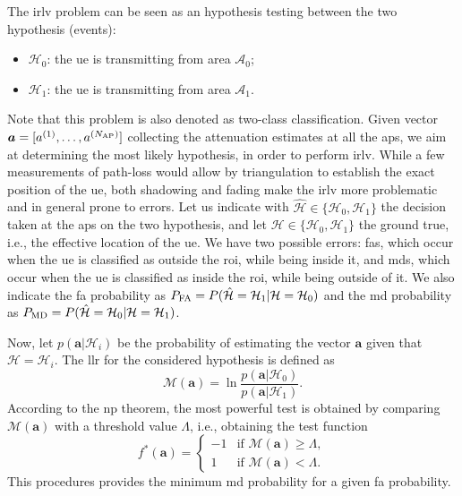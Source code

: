 \documentclass[draftcls,onecolumn,12pt]{IEEEtran}
\begin{document}
The \ac{irlv} problem can be seen as an hypothesis testing between the two hypothesis (events):
\begin{itemize}
    \item $\mathcal{H}_0$: the \ac{ue} is transmitting from area $\mathcal{A}_0$;
    \item $\mathcal{H}_1$: the \ac{ue} is transmitting from area $\mathcal{A}_1$.
\end{itemize}
Note that this problem is also denoted as two-class classification. Given vector $\bm{a} = [a^{(1)}, \ldots, a^{(N_{\rm AP})}]$ collecting the attenuation estimates at all the \acp{ap}, we aim  at determining the most likely hypothesis, in order to perform  \ac{irlv}. While a few measurements of path-loss would allow by triangulation to establish the exact position of the \ac{ue}, both shadowing and fading make the \ac{irlv} more problematic and in general prone to errors. Let us indicate with $\hat{\mathcal H} \in  \{\mathcal{H}_0, \mathcal{H}_1\}$ the decision taken at the \acp{ap} on the two hypothesis, and let $\mathcal H \in  \{\mathcal{H}_0, \mathcal{H}_1\}$ the ground true, i.e., the effective location of the \ac{ue}. We have two possible errors: \acp{fa}, which occur when the \ac{ue}  is classified as outside the \ac{roi}, while being inside it, and \acp{md}, which occur when the \ac{ue}  is classified as inside the \ac{roi}, while being outside of it. We also indicate the \ac{fa} probability  as $P_{\rm FA} =P(\hat{\mathcal H} = \mathcal H_1 | \mathcal H = \mathcal H_0)$ and the \ac{md} probability as $P_{\rm MD}=P(\hat{\mathcal H} = \mathcal H_0 | \mathcal H = \mathcal H_1)$.

Now, let  $p(\bm{a}|\mathcal{H}_i)$ be the probability of estimating the vector $\bm{a}$ given that  $\mathcal{H} = \mathcal{H}_i$. The \ac{llr} for the considered hypothesis is defined as 
\begin{equation}\label{eq:lr}
    {\mathcal M}(\bm{a})=\ln \frac{p(\bm{a}|\mathcal{H}_0)}{p(\bm{a}|\mathcal{H}_1)}.
\end{equation}
According to the \ac{np} theorem, the most powerful test is obtained by comparing $\mathcal{M}(\bm{a})$ with a threshold value $\Lambda$, i.e., obtaining the test function
\begin{equation}
\label{eq:oneClassDec}
f^*(\bm{a}) =
\begin{cases}
-1 &\text{if } {\mathcal M}(\bm{a}) \geq \Lambda, \\
1 & \text{if } {\mathcal M}(\bm{a}) < \Lambda.
\end{cases}
\end{equation}
This procedures  provides the minimum \ac{md} probability for a given  \ac{fa} probability.
\end{document}
